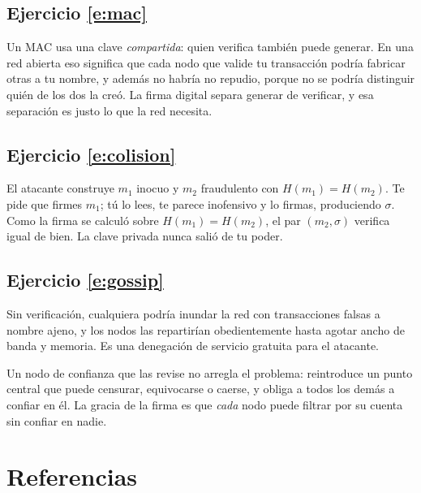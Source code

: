 \documentclass[11pt,a4paper]{article}
\theoremstyle{definition}
\theoremstyle{plain}
\theoremstyle{remark}
\begin{document}
\subsection*{Ejercicio \ref{e:mac}}
Un MAC usa una clave \emph{compartida}: quien verifica también puede generar. En
una red abierta eso significa que cada nodo que valide tu transacción podría
fabricar otras a tu nombre, y además no habría no repudio, porque no se podría
distinguir quién de los dos la creó. La firma digital separa generar de
verificar, y esa separación es justo lo que la red necesita.

\subsection*{Ejercicio \ref{e:colision}}
El atacante construye $m_1$ inocuo y $m_2$ fraudulento con $H(m_1) = H(m_2)$. Te
pide que firmes $m_1$; tú lo lees, te parece inofensivo y lo firmas, produciendo
$\sigma$. Como la firma se calculó sobre $H(m_1) = H(m_2)$, el par $(m_2,\sigma)$
verifica igual de bien. La clave privada nunca salió de tu poder.

\subsection*{Ejercicio \ref{e:gossip}}
Sin verificación, cualquiera podría inundar la red con transacciones falsas a
nombre ajeno, y los nodos las repartirían obedientemente hasta agotar ancho de
banda y memoria. Es una denegación de servicio gratuita para el atacante.

Un nodo de confianza que las revise no arregla el problema: reintroduce un punto
central que puede censurar, equivocarse o caerse, y obliga a todos los demás a
confiar en él. La gracia de la firma es que \emph{cada} nodo puede filtrar por su
cuenta sin confiar en nadie.

\section{Referencias}
\end{document}
